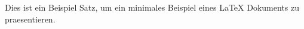 \documentclass{article}
\begin{document}
Dies ist ein Beispiel Satz, um ein minimales Beispiel eines
LaTeX Dokuments zu praesentieren.
\end{document}
